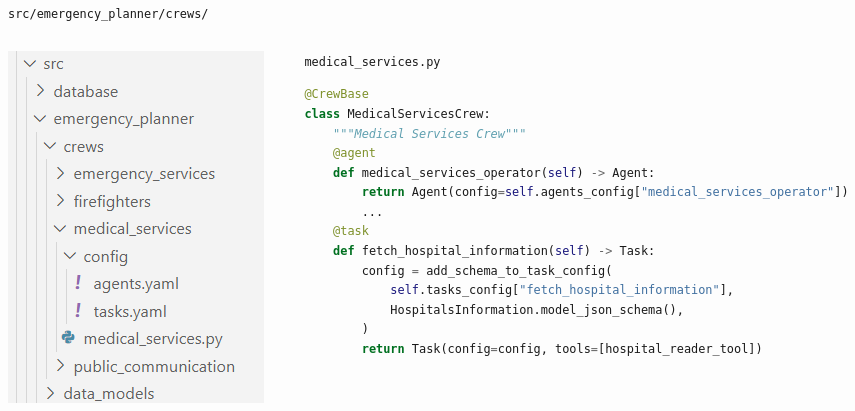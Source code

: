 \begin{frame}[fragile]{\texttt{src/emergency\_planner/crews/}}
    \begin{columns}[c]
      \begin{column}{0.3\textwidth}
          \includegraphics[width=\textwidth]{figures/crews_modules_folders.png}
      \end{column}
      \begin{column}{0.68\textwidth}
        \centering
        \texttt{medical\_services.py}
        \begin{lstlisting}[language=Python, breaklines=true]
@CrewBase
class MedicalServicesCrew:
    """Medical Services Crew"""
    @agent
    def medical_services_operator(self) -> Agent:
        return Agent(config=self.agents_config["medical_services_operator"])
        ...
    @task
    def fetch_hospital_information(self) -> Task:
        config = add_schema_to_task_config(
            self.tasks_config["fetch_hospital_information"],
            HospitalsInformation.model_json_schema(),
        )
        return Task(config=config, tools=[hospital_reader_tool])
        \end{lstlisting}
      \end{column}
    \end{columns}
\end{frame}